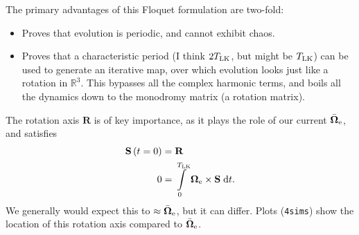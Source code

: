 \documentclass[11pt,
        usenames, %
        dvipsnames %
    ]{article}
\newcommand*{\bm}[1]{\boldsymbol{\mathbf{#1}}}
\newcommand*{\p}[1]{\left(#1\right)}
\begin{document}
The primary advantages of this Floquet formulation are two-fold:
\begin{itemize}
    \item Proves that evolution is periodic, and cannot exhibit chaos.

    \item Proves that a characteristic period (I think $2 T_{\rm LK}$, but might
        be $T_{\rm LK}$) can be used to generate an iterative map, over which
        evolution looks just like a rotation in $\mathbb{R}^3$. This bypasses
        all the complex harmonic terms, and boils all the dynamics down to
        the monodromy matrix (a rotation matrix).
\end{itemize}
The rotation axis $\bm{R}$ is of key importance, as it plays the role of our
current $\bar{\bm{\Omega}}_{\rm e}$, and satisfies
\begin{align}
    \bm{S}\p{t = 0} &= \bm{R} \\
    0 &= \int\limits_0^{T_{\rm LK}}
        \bm{\Omega}_{\rm e} \times \bm{S}\;\mathrm{d}t.
\end{align}
We generally would expect this to $\approx \bar{\bm{\Omega}}_{\rm e}$, but it
can differ. Plots (\lstinline{4sims}) show the location of this rotation axis
compared to $\bar{\bm{\Omega}}_{\rm e}$.
\end{document}
